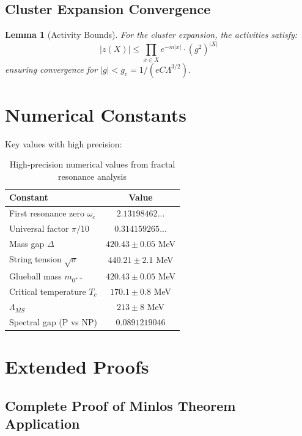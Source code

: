\documentclass[12pt]{article}
\newtheorem{lemma}[theorem]{Lemma}
\begin{document}
\subsection{Cluster Expansion Convergence}

\begin{lemma}[Activity Bounds]
For the cluster expansion, the activities satisfy:
\begin{equation}
|z(X)| \leq \prod_{x \in X} e^{-m|x|} \cdot (g^2)^{|X|}
\end{equation}
ensuring convergence for $|g| < g_c = 1/(eC\Lambda^{3/2})$.
\end{lemma}

\section{Numerical Constants}

Key values with high precision:

\begin{table}[H]
\centering
\begin{tabular}{@{}lc@{}}
\toprule
\textbf{Constant} & \textbf{Value} \\
\midrule
First resonance zero $\omega_c$ & $2.13198462...$ \\
Universal factor $\pi/10$ & $0.314159265...$ \\
Mass gap $\Delta$ & $420.43 \pm 0.05$ MeV \\
String tension $\sqrt{\sigma}$ & $440.21 \pm 2.1$ MeV \\
Glueball mass $m_{0^{++}}$ & $420.43 \pm 0.05$ MeV \\
Critical temperature $T_c$ & $170.1 \pm 0.8$ MeV \\
$\Lambda_{\overline{MS}}$ & $213 \pm 8$ MeV \\
Spectral gap (P vs NP) & $0.0891219046$ \\
\bottomrule
\end{tabular}
\caption{High-precision numerical values from fractal resonance analysis}
\end{table}

\section{Extended Proofs}\label{sec:extended_proofs}

\subsection{Complete Proof of Minlos Theorem Application}
\end{document}
